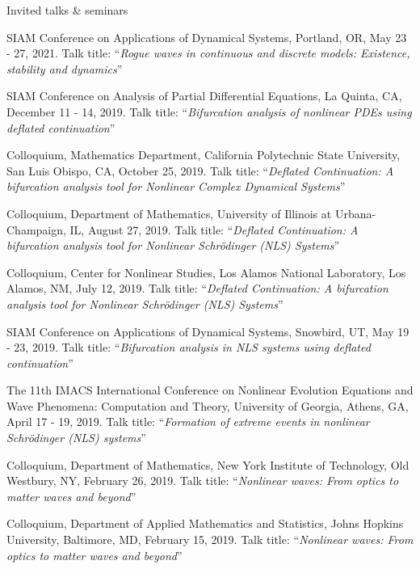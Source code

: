 \documentclass[10pt]{article} %
\newenvironment{innerlist}[1][\enskip\textbullet]%
        {\begin{compactitem}[#1]}{\end{compactitem}}
\begin{document}
\begin{section}{Invited talks \& seminars}
\begin{innerlist}
\item SIAM Conference on Applications of Dynamical Systems, Portland, OR, May 23 - 27, 2021. Talk title: 
``\textit{Rogue waves in continuous and discrete models: Existence, stability and dynamics}''

\item SIAM Conference on Analysis of Partial Differential Equations, La Quinta, CA, December 11 - 14, 2019. 
Talk title: ``\textit{Bifurcation analysis of nonlinear PDEs using deflated continuation}''

\item Colloquium, Mathematics Department, California Polytechnic State University, San Luis Obispo, CA, October 25, 2019. 
Talk title: ``\textit{Deflated Continuation: A bifurcation analysis tool for Nonlinear Complex Dynamical Systems}''  

\item Colloquium, Department of Mathematics, University of Illinois at Urbana-Champaign, IL, August 27, 2019.
      Talk title: ``\textit{Deflated Continuation: A bifurcation analysis tool for Nonlinear Schr\"odinger (NLS) Systems}''

\item Colloquium, Center for Nonlinear Studies, Los Alamos National Laboratory, Los Alamos, NM, July 12, 2019. 
      Talk title: ``\textit{Deflated Continuation: A bifurcation analysis tool for Nonlinear Schr\"odinger (NLS) Systems}''
       
\item SIAM Conference on Applications of Dynamical Systems, Snowbird, UT, May 19 - 23, 2019. Talk title: 
                    ``\textit{Bifurcation analysis in NLS systems using deflated continuation}''

\item The 11th IMACS International Conference on Nonlinear Evolution Equations and Wave Phenomena: Computation and Theory, %
        University of Georgia, Athens, GA, April 17 - 19, 2019. 
        Talk title: ``\textit{Formation of extreme events in nonlinear Schr\"odinger (NLS) systems}''

\item  Colloquium, Department of Mathematics, New York Institute of Technology, Old Westbury, NY, February 26, 2019.
       Talk title: ``\textit{Nonlinear waves: From optics to matter waves and beyond}''          
        
\item   Colloquium, Department of Applied Mathematics and Statistics, Johns Hopkins University, Baltimore, MD, February 15, 2019.
       Talk title: ``\textit{Nonlinear waves: From optics to matter waves and beyond}''        
        

\end{innerlist}
\end{section}
\end{document}
